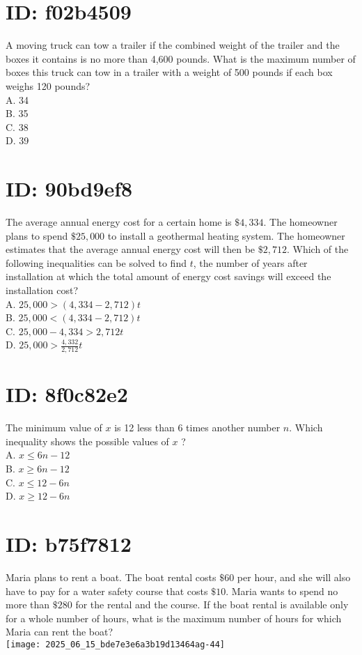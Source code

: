 \section*{ID: f02b4509}
A moving truck can tow a trailer if the combined weight of the trailer and the boxes it contains is no more than 4,600 pounds. What is the maximum number of boxes this truck can tow in a trailer with a weight of 500 pounds if each box weighs 120 pounds?\\
A. 34\\
B. 35\\
C. 38\\
D. 39

\section*{ID: 90bd9ef8}
The average annual energy cost for a certain home is $\$ 4,334$. The homeowner plans to spend $\$ 25,000$ to install a geothermal heating system. The homeowner estimates that the average annual energy cost will then be $\$ 2,712$. Which of the following inequalities can be solved to find $t$, the number of years after installation at which the total amount of energy cost savings will exceed the installation cost?\\
A. $25,000>(4,334-2,712) t$\\
B. $25,000<(4,334-2,712) t$\\
C. $25,000-4,334>2,712 t$\\
D. $25,000>\frac{4,332}{2,712} t$

\section*{ID: 8f0c82e2}
The minimum value of $x$ is 12 less than 6 times another number $n$. Which inequality shows the possible values of $x$ ?\\
A. $x \leq 6 n-12$\\
B. $x \geq 6 n-12$\\
C. $x \leq 12-6 n$\\
D. $x \geq 12-6 n$

\section*{ID: b75f7812}
Maria plans to rent a boat. The boat rental costs $\$ 60$ per hour, and she will also have to pay for a water safety course that costs $\$ 10$. Maria wants to spend no more than $\$ 280$ for the rental and the course. If the boat rental is available only for a whole number of hours, what is the maximum number of hours for which Maria can rent the boat?\\
\texttt{[image: 2025\_06\_15\_bde7e3e6a3b19d13464ag-44]}

